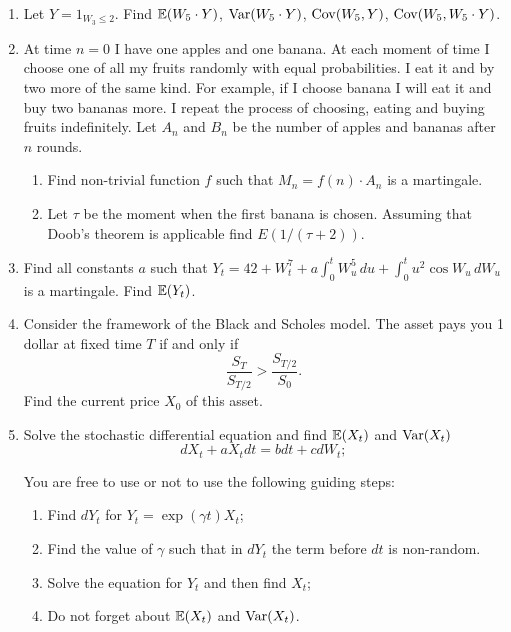 \documentclass[12pt, a4paper]{article}
\begin{document}
\begin{enumerate}


\item Let $Y = 1_{W_3 \leq 2}$. Find $\mathbb{E}(W_5 \cdot Y)$, $\operatorname{Var}(W_5 \cdot Y)$, $\operatorname{Cov}(W_5, Y)$, $\operatorname{Cov}(W_5, W_5 \cdot Y)$.

\item At time $n=0$ I have one apples and one banana. At each moment of time I choose one of all my fruits randomly with equal probabilities. I eat it and by two more of the same kind. For example, if I choose banana I will eat it and buy two bananas more. I repeat the process of choosing, eating and buying fruits indefinitely. Let $A_n$ and $B_n$ be the number of apples and bananas after $n$ rounds.

\begin{enumerate}
  \item Find non-trivial function $f$ such that $M_n = f(n) \cdot A_n$ is a martingale.
  \item Let $\tau$ be the moment when the first banana is chosen. Assuming that Doob's theorem is applicable find $E(1/(\tau + 2))$.
\end{enumerate}


\item Find all constants $a$ such that $Y_t = 42 + W_t^7 + a\int_0^t W_u^5 \, du + \int_0^t u^2 \cos W_u \, dW_u$ is a martingale. Find $\mathbb{E}(Y_t)$.

\item Consider the framework of the Black and Scholes model. The asset pays you 1 dollar at fixed time $T$ if and only if
\[
\frac{S_T}{S_{T/2}} > \frac{S_{T/2}}{S_0}.
\]
Find the current price $X_0$ of this asset.


\item Solve the stochastic differential equation and find $\mathbb{E}(X_t)$ and $\operatorname{Var}(X_t)$
\[
dX_t + aX_t dt = b dt + c dW_t;
\]

You are free to use or not to use the following guiding steps:

\begin{enumerate}
  \item Find $dY_t$ for $Y_t = \exp(\gamma t)X_t$;
  \item Find the value of $\gamma$ such that in $dY_t$ the term before $dt$ is non-random.
  \item Solve the equation for $Y_t$ and then find $X_t$;
  \item Do not forget about $\mathbb{E}(X_t)$ and $\operatorname{Var}(X_t)$.
\end{enumerate}

\end{enumerate}
\end{document}
